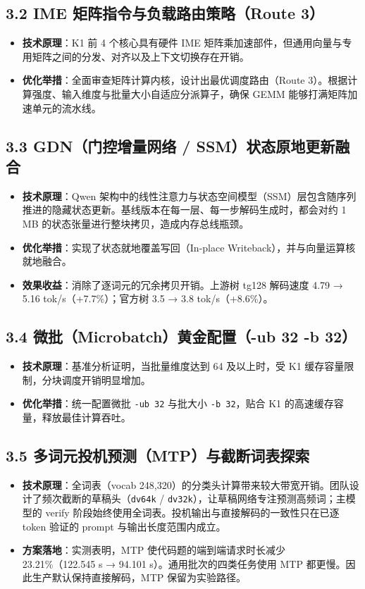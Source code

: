 \documentclass[10pt,a4paper,fontset=none]{ctexart}
\begin{document}
\subsection{3.2 IME 矩阵指令与负载路由策略（Route 3）}
\begin{itemize}
  \item \textbf{技术原理}：K1 前 4 个核心具有硬件 IME 矩阵乘加速部件，但通用向量与专用矩阵之间的分发、对齐以及上下文切换存在开销。
  \item \textbf{优化举措}：全面审查矩阵计算内核，设计出最优调度路由（Route 3）。根据计算强度、输入维度与批量大小自适应分派算子，确保 GEMM 能够打满矩阵加速单元的流水线。
\end{itemize}

\subsection{3.3 GDN（门控增量网络 / SSM）状态原地更新融合}
\begin{itemize}
  \item \textbf{技术原理}：Qwen 架构中的线性注意力与状态空间模型（SSM）层包含随序列推进的隐藏状态更新。基线版本在每一层、每一步解码生成时，都会对约 1 MB 的状态张量进行整块拷贝，造成内存总线瓶颈。
  \item \textbf{优化举措}：实现了状态就地覆盖写回（In-place Writeback），并与向量运算核就地融合。
  \item \textbf{效果收益}：消除了逐词元的冗余拷贝开销。上游树 tg128 解码速度 4.79 → 5.16 tok/s（+7.7\%）；官方树 3.5 → 3.8 tok/s（+8.6\%）。
\end{itemize}

\subsection{3.4 微批（Microbatch）黄金配置（-ub 32 -b 32）}
\begin{itemize}
  \item \textbf{技术原理}：基准分析证明，当批量维度达到 64 及以上时，受 K1 缓存容量限制，分块调度开销明显增加。
  \item \textbf{优化举措}：统一配置微批 \texttt{-ub 32} 与批大小 \texttt{-b 32}，贴合 K1 的高速缓存容量，释放最佳计算吞吐。
\end{itemize}

\subsection{3.5 多词元投机预测（MTP）与截断词表探索}
\begin{itemize}
  \item \textbf{技术原理}：全词表（vocab 248,320）的分类头计算带来较大带宽开销。团队设计了频次截断的草稿头（\texttt{dv64k} / \texttt{dv32k}），让草稿网络专注预测高频词；主模型的 verify 阶段始终使用全词表。投机输出与直接解码的一致性只在已逐 token 验证的 prompt 与输出长度范围内成立。
  \item \textbf{方案落地}：实测表明，MTP 使代码题的端到端请求时长减少 23.21\%（122.545 s → 94.101 s）。通用批次的四类任务使用 MTP 都更慢。因此生产默认保持直接解码，MTP 保留为实验路径。
\end{itemize}
\end{document}

